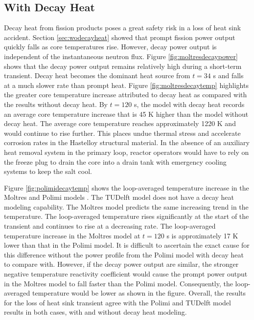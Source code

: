 \clearpage

\subsection{With Decay Heat}

Decay heat from fission products poses a great safety risk in a loss of
heat sink accident. Section \ref{sec:wodecayheat} showed that prompt fission
power output quickly falls as core temperatures rise. However, decay power
output is independent of the instantaneous neutron flux. Figure
\ref{fig:moltresdecaypower} shows that the decay power output remains
relatively high during a short-term transient. Decay heat becomes the dominant
heat source from $t=34$ s and falls at a much slower rate than prompt heat.
Figure \ref{fig:moltresdecaytemp} highlights the
greater core temperature increase attributed to decay heat as compared with
the results without decay heat. By $t=120$ s, the model with decay heat
records an average core temperature increase that is 45 K higher than the
model without decay heat. The average core temperature reaches approximately
1220 K and would continue to rise further. This places undue thermal stress
and accelerate corrosion rates in the Hastelloy structural material. In the
absence of an auxiliary heat removal system in the primary loop, reactor
operators would have to rely on the freeze plug to drain the core into a drain
tank with emergency cooling systems to keep the salt cool.

Figure \ref{fig:polimidecaytemp} shows the loop-averaged temperature
increase in the Moltres and Polimi models \cite{fiorina_modelling_2014}. The
TUDelft model does not have a decay heat modeling capability. The Moltres
model predicts the same increasing trend in the temperature. The loop-averaged
temperature rises significantly at the start of the transient and continues to
rise at a decreasing rate. The loop-averaged temperature increase in the
Moltres model at $t=120$ s is approximately 17 K lower than that in the Polimi
model. It is difficult to ascertain the exact cause for this difference
without the power profile from the Polimi model with decay heat to compare
with. However, if the decay power output are similar, the stronger negative
temperature reactivity coefficient would cause the prompt power output in the
Moltres model to fall faster than the Polimi model. Consequently, the
loop-averaged temperature would be lower as shown in the figure. Overall, the
results for the loss of heat sink transient agree with the Polimi and TUDelft
model results in both cases, with and without decay heat modeling.

